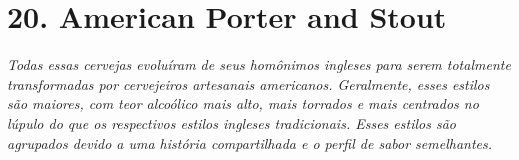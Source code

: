 \section*{20. American Porter and Stout}
\textit{Todas essas cervejas evoluíram de seus homônimos ingleses para serem totalmente transformadas por cervejeiros artesanais americanos. Geralmente, esses estilos são maiores, com teor alcoólico mais alto, mais torrados e mais centrados no lúpulo do que os respectivos estilos ingleses tradicionais. Esses estilos são agrupados devido a uma história compartilhada e o perfil de sabor semelhantes.}
